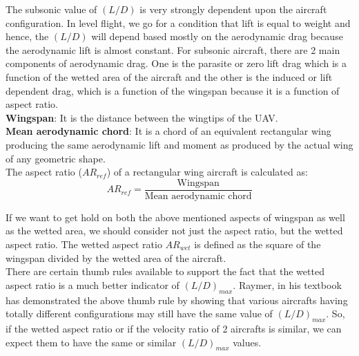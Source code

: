\documentclass[12 pt]{article}
\begin{document}
The subsonic value of ${(L/D)}$ is very strongly dependent upon the aircraft configuration. In level flight, we go for a condition that lift is equal to weight and hence, the ${(L/D)}$ will depend based mostly on the aerodynamic drag because the aerodynamic lift is almost constant. For subsonic aircraft, there are 2 main components of aerodynamic drag. One is the parasite or zero lift drag which is a function of the wetted area of the aircraft and the other is the induced or lift dependent drag, which is a function of the wingspan because it is a function of aspect ratio.\\

\textbf{Wingspan}: It is the distance between the wingtips of the UAV.\\

\textbf{Mean aerodynamic chord}: It is a chord of an equivalent rectangular wing producing the same aerodynamic lift and moment as produced by the actual wing of any geometric shape.\\

The aspect ratio (${AR}_{ref}$) of a rectangular wing aircraft is calculated as:
\[ {AR}_{ref} = \frac{{\text{Wingspan}}}{{\text{Mean aerodynamic chord}}}\tag{3.1}\] 

If we want to get hold on both the above mentioned aspects of wingspan as well as the wetted area, we should consider not just the aspect ratio, but the wetted aspect ratio. The wetted aspect ratio ${{AR}_{wet}}$ is defined as the square of the wingspan divided by the wetted area of the aircraft.\\

There are certain thumb rules available to support the fact that the wetted aspect ratio is a much better indicator of ${(L/D)_{max}}$.
Raymer, in his textbook has demonstrated the above thumb rule by showing that various aircrafts having totally different configurations may still have the same value of ${(L/D)}_{max}$. So, if the wetted aspect ratio or if the velocity ratio of 2 aircrafts is similar, we can expect them to have the same or similar ${(L/D)}_{max}$ values.\\
\end{document}
